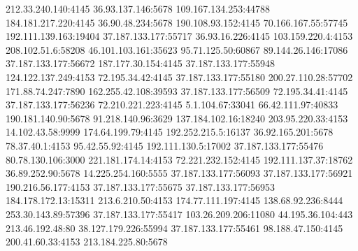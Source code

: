 212.33.240.140:4145
36.93.137.146:5678
109.167.134.253:44788
184.181.217.220:4145
36.90.48.234:5678
190.108.93.152:4145
70.166.167.55:57745
192.111.139.163:19404
37.187.133.177:55717
36.93.16.226:4145
103.159.220.4:4153
208.102.51.6:58208
46.101.103.161:35623
95.71.125.50:60867
89.144.26.146:17086
37.187.133.177:56672
187.177.30.154:4145
37.187.133.177:55948
124.122.137.249:4153
72.195.34.42:4145
37.187.133.177:55180
200.27.110.28:57702
171.88.74.247:7890
162.255.42.108:39593
37.187.133.177:56509
72.195.34.41:4145
37.187.133.177:56236
72.210.221.223:4145
5.1.104.67:33041
66.42.111.97:40833
190.181.140.90:5678
91.218.140.96:3629
137.184.102.16:18240
203.95.220.33:4153
14.102.43.58:9999
174.64.199.79:4145
192.252.215.5:16137
36.92.165.201:5678
78.37.40.1:4153
95.42.55.92:4145
192.111.130.5:17002
37.187.133.177:55476
80.78.130.106:3000
221.181.174.14:4153
72.221.232.152:4145
192.111.137.37:18762
36.89.252.90:5678
14.225.254.160:5555
37.187.133.177:56093
37.187.133.177:56921
190.216.56.177:4153
37.187.133.177:55675
37.187.133.177:56953
184.178.172.13:15311
213.6.210.50:4153
174.77.111.197:4145
138.68.92.236:8444
253.30.143.89:57396
37.187.133.177:55417
103.26.209.206:11080
44.195.36.104:443
213.46.192.48:80
38.127.179.226:55994
37.187.133.177:55461
98.188.47.150:4145
200.41.60.33:4153
213.184.225.80:5678